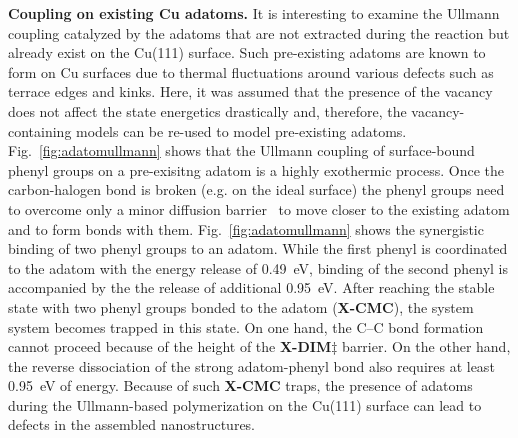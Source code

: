 \documentclass[aps,prb,amsmath,amssymb,11pt]{revtex4-1}
\begin{document}
\textbf{Coupling on existing Cu adatoms.} It is interesting to examine the Ullmann coupling catalyzed by the adatoms that are not extracted during the reaction but already exist on the Cu(111) surface. Such pre-existing adatoms are known to form on Cu surfaces due to thermal fluctuations around various defects such as terrace edges and kinks. Here, it was assumed that the presence of the vacancy does not affect the state energetics drastically and, therefore, the vacancy-containing models can be re-used to model pre-existing adatoms. Fig.~\ref{fig:adatomullmann} shows that the Ullmann coupling of surface-bound phenyl groups on a pre-exisitng adatom is a highly exothermic process. Once the carbon-halogen bond is broken (e.g. on the ideal surface) the phenyl groups need to overcome only a minor diffusion barrier~\cite{pccp2010} to move closer to the existing adatom and to form bonds with them. 
%
%
Fig.~\ref{fig:adatomullmann} shows the synergistic binding of two phenyl groups to an adatom. While the first phenyl is coordinated to the adatom with the energy release of \SI{0.49}{\electronvolt}, binding of the second phenyl is accompanied by the the release of additional \SI{0.95}{\electronvolt}. 
%
After reaching the stable state with two phenyl groups bonded to the adatom (\textbf{X-CMC}), the system system becomes trapped in this state. On one hand, the C--C bond formation cannot proceed because of the height of the \textbf{X-DIM$\ddagger$} barrier. On the other hand, the reverse dissociation of the strong adatom-phenyl bond also requires at least \SI{0.95}{\electronvolt} of energy. 
Because of such \textbf{X-CMC} traps, the presence of adatoms during the Ullmann-based polymerization on the Cu(111) surface can lead to defects in the assembled nanostructures.

\ifdefined\INTERNAL
\end{document}
